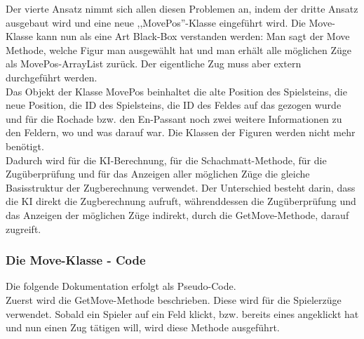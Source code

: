 \documentclass[12pt,a4paper]{article}
\begin{document}
Der vierte Ansatz nimmt sich allen diesen Problemen an, indem der dritte Ansatz ausgebaut wird und eine neue ,,MovePos''-Klasse eingeführt wird. Die Move-Klasse kann nun als eine Art Black-Box verstanden werden: Man sagt der Move Methode, welche Figur man ausgewählt hat und man erhält alle möglichen Züge als MovePos-ArrayList zurück. Der eigentliche Zug muss aber extern durchgeführt werden. \\
Das Objekt der Klasse MovePos beinhaltet die alte Position des Spielsteins, die neue Position, die ID des Spielsteins, die ID des Feldes auf das gezogen wurde und für die Rochade bzw. den En-Passant noch zwei weitere Informationen zu den Feldern, wo und was darauf war. Die Klassen der Figuren werden nicht mehr benötigt. \\
Dadurch wird für die KI-Berechnung, für die Schachmatt-Methode, für die Zugüberprüfung und für das Anzeigen aller möglichen Züge die gleiche Basisstruktur der Zugberechnung verwendet. Der Unterschied besteht darin, dass die KI direkt die Zugberechnung aufruft, währenddessen die Zugüberprüfung und das Anzeigen der möglichen Züge indirekt, durch die GetMove-Methode, darauf zugreift.\\


\subsubsection{Die Move-Klasse - Code}
\label{SUBSUBSEC:MOVECODE}

Die folgende Dokumentation erfolgt als Pseudo-Code. \\
Zuerst wird die GetMove-Methode beschrieben. Diese wird für die Spielerzüge verwendet. Sobald ein Spieler auf ein Feld klickt, bzw. bereits eines angeklickt hat und nun einen Zug tätigen will, wird diese Methode ausgeführt. \\
\end{document}
